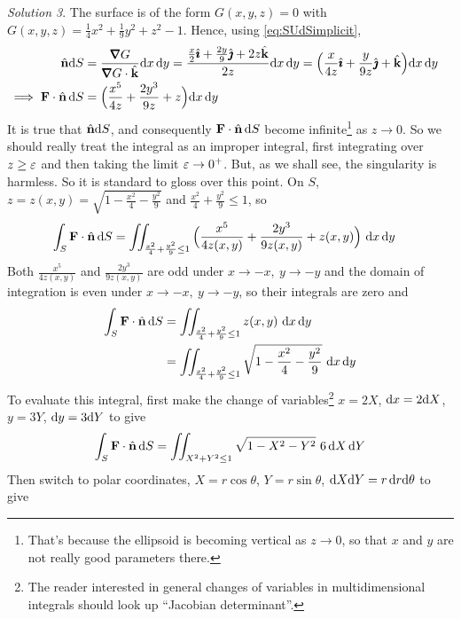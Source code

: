 \begin{eg}
\medskip
\noindent\textit{Solution 3}. 
The surface is of the form $G(x,y,z)=0$ with
$G(x,y,z)=\frac{1}{4}x^2+\frac{1}{9}y^2+z^2-1$. Hence, using
 \eqref{eq:SUdSimplicit},
\begin{align*}
\hn \dee{S}&=\frac{\vnabla G}{\vnabla G\cdot\hk}\dee{x}\,\dee{y}
=\frac{\frac{x}{2}\hi+\frac{2y}{9}\hj+2z\hk}{2z}\dee{x}\,\dee{y}
=\Big(\frac{x}{4z}\hi+\frac{y}{9z}\hj+\hk\Big)\dee{x}\,\dee{y}\cr
\implies \vF\cdot\hn\,\dee{S} 
&=\Big(\frac{x^5}{4z}+\frac{2y^3}{9z}+z\Big)\dee{x}\,\dee{y}
\end{align*}
It is true that $\hat{\mathbf{n}}\mathrm{d}S$, and consequently $\mathbf{F}\cdot\hat{\mathbf{n}}\,\mathrm{d}S$
become infinite\footnote{That's because the ellipsoid is becoming vertical as
$z\rightarrow 0$, so that $x$ and $y$ are not really good parameters there.} 
as $z\rightarrow 0$. So we should really treat the integral as
an improper integral, first integrating over $z\ge \varepsilon$ and then taking the 
limit $\varepsilon\rightarrow 0^+$. But, as we shall see, the singularity is 
harmless. So it is standard to gloss over this point.
On $S$, $z=z(x,y)=\sqrt{1-\frac{x^2}{4}-\frac{y^2}{9}}$ 
and $\frac{x^2}{4}+\frac{y^2}{9}\le 1$, so
\begin{align*}
\int_S \vF\cdot\hn\, \dee{S}
&=\dblInt_{\frac{x^2}{4}+\frac{y^2}{9}\le 1}
\Big(\frac{x^5}{4z(x,y)}+\frac{2y^3}{9z(x,y)}+z(x,y)\Big)\ \dee{x}\,\dee{y}
\end{align*}
Both $\frac{x^5}{4z(x,y)}$ and $\frac{2y^3}{9z(x,y)}$ are odd
under $x\rightarrow-x,\ y\rightarrow -y$ and the domain of integration
is even under $x\rightarrow-x,\ y\rightarrow -y$, so their integrals are zero and
\begin{align*}
\int_S \mathbf{F}\cdot\hat{\mathbf{n}}\, \mathrm{d}S
&=\iint_{\frac{x^2}{4}+\frac{y^2}{9}\le 1}z(x,y)\ \mathrm{d}x\,\mathrm{d}y \\
&=\iint_{\frac{x^2}{4}+\frac{y^2}{9}\le 1}
\sqrt{1-\frac{x^2}{4}-\frac{y^2}{9}}\ \mathrm{d}x\,\mathrm{d}y
\end{align*}
To evaluate this integral, first make the change of variables\footnote{
The reader interested in general changes of variables in multidimensional
integrals should look up ``Jacobian determinant''.}
$x=2X$, $\mathrm{d}x=2\mathrm{d}X$, $y=3Y$, $\mathrm{d}y=3\mathrm{d}Y$
to give 
\begin{equation*}
\int_S \mathbf{F}\cdot\hat{\mathbf{n}}\, \mathrm{d}S
=\iint_{X^2+Y^2\le 1}
\sqrt{1-X^2-Y^2}\ 6\,\mathrm{d}X\,\mathrm{d}Y
\end{equation*}
Then switch to polar coordinates, $X=r\cos\theta$, $Y=r\sin\theta$,
$\mathrm{d}X\mathrm{d}Y = r\,\mathrm{d}r\mathrm{d}\theta$ to give
\end{eg}
